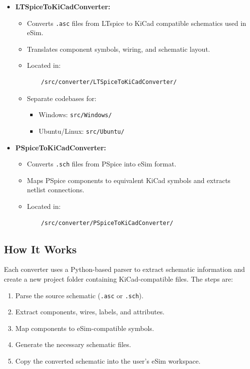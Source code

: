 \begin{itemize}
  \item \textbf{LTSpiceToKiCadConverter:}
  \begin{itemize}
    \item Converts \texttt{.asc} files from LTspice to KiCad compatible schematics used in eSim.
    \item Translates component symbols, wiring, and schematic layout.
    \item Located in:
    \begin{verbatim}
    /src/converter/LTSpiceToKiCadConverter/
    \end{verbatim}
    \item Separate codebases for:
    \begin{itemize}
      \item Windows: \texttt{src/Windows/}
      \item Ubuntu/Linux: \texttt{src/Ubuntu/}
    \end{itemize}
  \end{itemize}

  \item \textbf{PSpiceToKiCadConverter:}
  \begin{itemize}
    \item Converts \texttt{.sch} files from PSpice into eSim format.
    \item Maps PSpice components to equivalent KiCad symbols and extracts netlist connections.
    \item Located in:
    \begin{verbatim}
    /src/converter/PSpiceToKiCadConverter/
    \end{verbatim}
  \end{itemize}
\end{itemize}

\subsection{How It Works}
Each converter uses a Python-based parser to extract schematic information and create a new project folder containing KiCad-compatible files. The steps are:

\begin{enumerate}
  \item Parse the source schematic (\texttt{.asc} or \texttt{.sch}).
  \item Extract components, wires, labels, and attributes.
  \item Map components to eSim-compatible symbols.
  \item Generate the necessary schematic files.
  \item Copy the converted schematic into the user's eSim workspace.
\end{enumerate}

